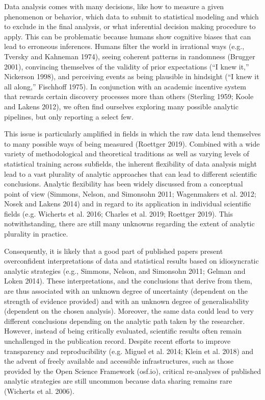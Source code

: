 \documentclass[
  12pt,
]{article}
\begin{document}
Data analysis comes with many decisions, like how to measure a given phenomenon or behavior, which data to submit to statistical modeling and which to exclude in the final analysis, or what inferential decision making procedure to apply.
This can be problematic because humans show cognitive biases that can lead to erroneous inferences.
Humans filter the world in irrational ways (e.g., Tversky and Kahneman 1974), seeing coherent patterns in randomness (Brugger 2001), convincing themselves of the validity of prior expectations ({``I knew it,''} Nickerson 1998), and perceiving events as being plausible in hindsight ({``I knew it all along,''} Fischhoff 1975).
In conjunction with an academic incentive system that rewards certain discovery processes more than others (Sterling 1959; Koole and Lakens 2012), we often find ourselves exploring many possible analytic pipelines, but only reporting a select few.

This issue is particularly amplified in fields in which the raw data lend themselves to many possible ways of being measured (Roettger 2019).
Combined with a wide variety of methodological and theoretical traditions as well as varying levels of statistical training across subfields, the inherent flexibility of data analysis might lead to a vast plurality of analytic approaches that can lead to different scientific conclusions.
Analytic flexibility has been widely discussed from a conceptual point of view (Simmons, Nelson, and Simonsohn 2011; Wagenmakers et al. 2012; Nosek and Lakens 2014) and in regard to its application in individual scientific fields (e.g. Wicherts et al. 2016; Charles et al. 2019; Roettger 2019).
This notwithstanding, there are still many unknowns regarding the extent of analytic plurality in practice.

Consequently, it is likely that a good part of published papers present overconfident interpretations of data and statistical results based on idiosyncratic analytic strategies (e.g., Simmons, Nelson, and Simonsohn 2011; Gelman and Loken 2014).
These interpretations, and the conclusions that derive from them, are thus associated with an unknown degree of uncertainty (dependent on the strength of evidence provided) and with an unknown degree of generalisability (dependent on the chosen analysis).
Moreover, the same data could lead to very different conclusions depending on the analytic path taken by the researcher.
However, instead of being critically evaluated, scientific results often remain unchallenged in the publication record.
Despite recent efforts to improve transparency and reproducibility (e.g. Miguel et al. 2014; Klein et al. 2018) and the advent of freely available and accessible infrastructures, such as those provided by the Open Science Framework (osf.io), critical re-analyses of published analytic strategies are still uncommon because data sharing remains rare (Wicherts et al. 2006).
\end{document}
